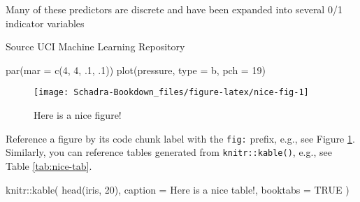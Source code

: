 \documentclass[
]{book}
\newenvironment{Shaded}{\begin{snugshade}}{\end{snugshade}}
\newcommand{\AttributeTok}[1]{\textcolor[rgb]{0.77,0.63,0.00}{#1}}
\newcommand{\ConstantTok}[1]{\textcolor[rgb]{0.00,0.00,0.00}{#1}}
\newcommand{\DecValTok}[1]{\textcolor[rgb]{0.00,0.00,0.81}{#1}}
\newcommand{\FunctionTok}[1]{\textcolor[rgb]{0.00,0.00,0.00}{#1}}
\newcommand{\NormalTok}[1]{#1}
\newcommand{\SpecialCharTok}[1]{\textcolor[rgb]{0.00,0.00,0.00}{#1}}
\newcommand{\StringTok}[1]{\textcolor[rgb]{0.31,0.60,0.02}{#1}}
\begin{document}
Many of these predictors are discrete and have been expanded into several 0/1 indicator variables

Source
UCI Machine Learning Repository

\begin{Shaded}
\begin{Highlighting}[]
\FunctionTok{par}\NormalTok{(}\AttributeTok{mar =} \FunctionTok{c}\NormalTok{(}\DecValTok{4}\NormalTok{, }\DecValTok{4}\NormalTok{, .}\DecValTok{1}\NormalTok{, .}\DecValTok{1}\NormalTok{))}
\FunctionTok{plot}\NormalTok{(pressure, }\AttributeTok{type =} \StringTok{\textquotesingle{}b\textquotesingle{}}\NormalTok{, }\AttributeTok{pch =} \DecValTok{19}\NormalTok{)}
\end{Highlighting}
\end{Shaded}

\begin{figure}

{\centering \texttt{[image: Schadra-Bookdown\_files/figure-latex/nice-fig-1]} 

}

\caption{Here is a nice figure!}\label{fig:nice-fig}
\end{figure}

Reference a figure by its code chunk label with the \texttt{fig:} prefix, e.g., see Figure \ref{fig:nice-fig}. Similarly, you can reference tables generated from \texttt{knitr::kable()}, e.g., see Table \ref{tab:nice-tab}.

\begin{Shaded}
\begin{Highlighting}[]
\NormalTok{knitr}\SpecialCharTok{::}\FunctionTok{kable}\NormalTok{(}
  \FunctionTok{head}\NormalTok{(iris, }\DecValTok{20}\NormalTok{), }\AttributeTok{caption =} \StringTok{\textquotesingle{}Here is a nice table!\textquotesingle{}}\NormalTok{,}
  \AttributeTok{booktabs =} \ConstantTok{TRUE}
\NormalTok{)}
\end{Highlighting}
\end{Shaded}
\end{document}
